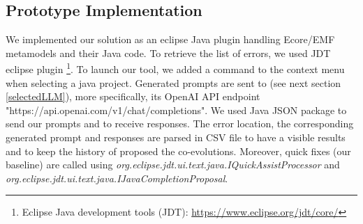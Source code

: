 \subsection{Prototype Implementation}
We implemented our solution as an eclipse Java plugin handling Ecore/EMF metamodels and their Java code. To retrieve the list of errors, we used JDT eclipse plugin \footnote{Eclipse Java development tools (JDT): \url{https://www.eclipse.org/jdt/core/}}. To launch our tool, we added a command to the context menu when selecting a java project. Generated prompts are sent to \LLM (see next section \ref{selectedLLM}), more specifically, its OpenAI API endpoint "https://api.openai.com/v1/chat/completions". We used Java JSON package to send our prompts and to receive \LLM responses. The error location, the corresponding generated prompt and \LLM responses are parsed in CSV file to have a visible results and to keep the history of proposed the co-evolutions.
Moreover, quick fixes (our baseline) are called using 
\textit{org.eclipse.jdt.ui.text.java.IQuickAssistProcessor} and \textit{org.eclipse.jdt.ui.text.java.IJavaCompletionProposal}.